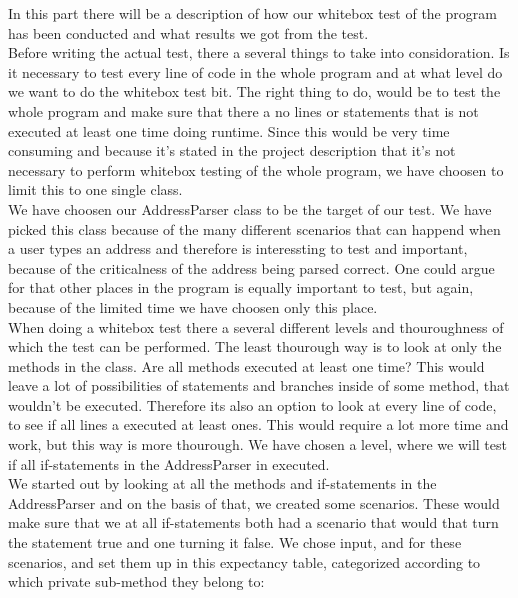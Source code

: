 \documentclass[a4paper,10pt,titlepage]{article}
\begin{document}
			In this part there will be a description of how our whitebox test of the program has been conducted and what results we got from the test. \\
Before writing the actual test, there a several things to take into considoration. Is it necessary to test every line of code in the whole program and at what level do we want to do the whitebox test bit. The right thing to do, would be to test the whole program and make sure that there a no lines or statements that is not executed at least one time doing runtime. Since this would be very time consuming and because it's stated in the project description that it's not necessary to perform whitebox testing of the whole program, we have choosen to limit this to one single class.  \\
We have choosen our AddressParser class to be the target of our test. We have picked this class because of the many different scenarios that can happend when a user types an address and therefore is interessting to test and important, because of the criticalness of the address being parsed correct. One could argue for that other places in the program is equally important to test, but again, because of the limited time we have choosen only this place. \\
When doing a whitebox test there a several different levels and thouroughness of which the test can be performed. The least thourough way is to look at only the methods in the class. Are all methods executed at least one time? This would leave a lot of possibilities of statements and branches inside of some method, that wouldn't be executed. Therefore its also an option to look at every line of code, to see if all lines a executed at least ones. This would require a lot more time and work, but this way is more thourough. We have chosen a level, where we will test if all if-statements in the AddressParser in executed. \\

We started out by looking at all the methods and if-statements in the AddressParser and on the basis of that, we created some scenarios. These would make sure that we at all if-statements both had a scenario that would that turn the statement true and one turning it false. We chose input, and for these scenarios, and set them up in this expectancy table, categorized according to which private sub-method they belong to:
\end{document}
